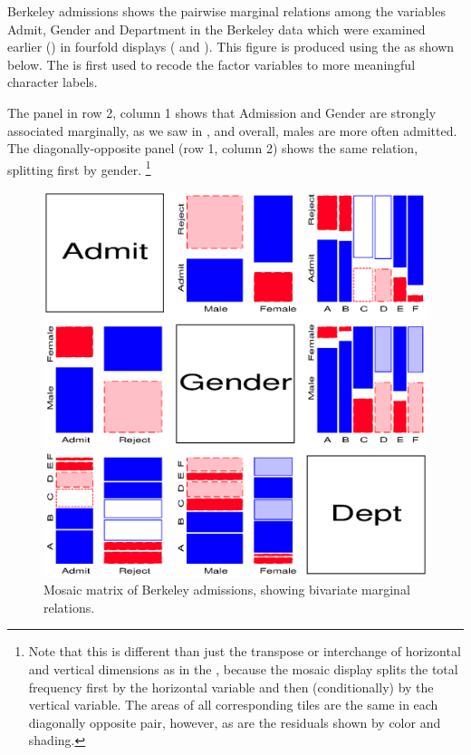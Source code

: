 \begin{Example}[berkeley4]{Berkeley admissions}
 shows the pairwise marginal
relations among the variables
Admit, Gender and Department in the Berkeley
data which were examined earlier () in fourfold displays
( and ).
This figure is produced using the  as shown below.
The  is first used to recode the factor variables
to more meaningful character labels.


The panel in row 2, column 1
shows that Admission and Gender are
strongly associated marginally, as we saw in ,
and overall, males are more often admitted.
The diagonally-opposite panel (row 1, column 2) shows the
same relation, splitting first by gender.%
%
\footnote{Note that this is different than just the transpose or interchange
of horizontal and vertical dimensions as in the \scatmat{},
because the mosaic display splits the total frequency first by the horizontal
variable and then (conditionally) by the vertical variable.
The areas of all corresponding tiles are the same in each diagonally
opposite pair, however, as are the
residuals shown by color and shading.}
%
\begin{figure}[!htb]
  \centering
  \includegraphics[scale=.8]{ch4/fig/mosmat9a}
  \caption[Marginal mosaic matrix of Berkeley
admissions]{Mosaic matrix of Berkeley
admissions, showing bivariate marginal relations.}\label{fig:mosmat9a}
\end{figure}


\end{Example}
